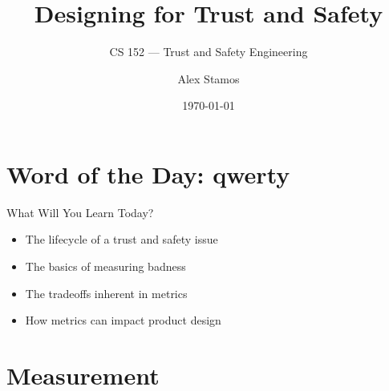 \documentclass[nobackground,dvipsnames,table,aspectratio=169]{beamer}
\title{Designing for Trust and Safety}
\subtitle{CS 152 --- Trust and Safety Engineering}
\author[A. Stamos]{Alex Stamos}
\institute[Stanford University]{Stanford Cyber Policy Center}
\date[2022]{\today}
\begin{document}
\begin{frame}
    \titlepage
\end{frame}

\section{Word of the Day: qwerty}

\begin{frame}{What Will You Learn Today?}
    \begin{itemize}
        \item The lifecycle of a trust and safety issue
        \item The basics of measuring badness
        \item The tradeoffs inherent in metrics
        \item How metrics can impact product design
    \end{itemize}
\end{frame}

\section{Measurement}
\end{document}
